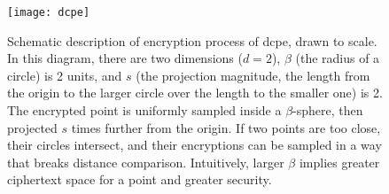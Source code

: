 \begin{figure}[!ht]
	\centering
	\texttt{[image: dcpe]}
	\caption[Schematic description of \acrshort{dcpe}]{
		Schematic description of encryption process of \acrshort{dcpe}, drawn to scale.
		In this diagram, there are two dimensions ($d = 2$), $\beta$ (the radius of a circle) is 2 units, and $s$ (the projection magnitude, the length from the origin to the larger circle over the length to the smaller one) is 2.
		The encrypted point is uniformly sampled inside a $\beta$-sphere, then projected $s$ times further from the origin.
		If two points are too close, their circles intersect, and their encryptions can be sampled in a way that breaks distance comparison.
		Intuitively, larger $\beta$ implies greater ciphertext space for a point and greater security.
	}\label{figure:dcpe}
\end{figure}
